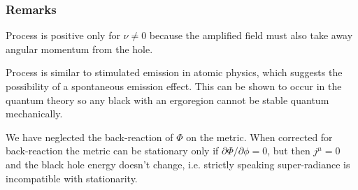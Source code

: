 \subsubsection{Remarks}
\begin{list}{)}
{}
\item Process is positive only for $\nu\neq 0$ because the amplified field 
must also take away angular momentum from the hole.

\item Process is similar to stimulated emission in atomic physics, which
suggests the possibility of a spontaneous emission effect. This can be shown to
occur in the quantum theory so any black with an ergoregion cannot be stable
quantum mechanically.

\item  We have neglected the back-reaction of $\Phi$ on the metric.  When 
corrected for back-reaction the metric can be stationary only if
$\partial\Phi/\partial\phi=0$, but then $j^{\mu}=0$ and the black hole energy
doesn't change, i.e. strictly speaking super-radiance is incompatible with
stationarity.

\end{list}




